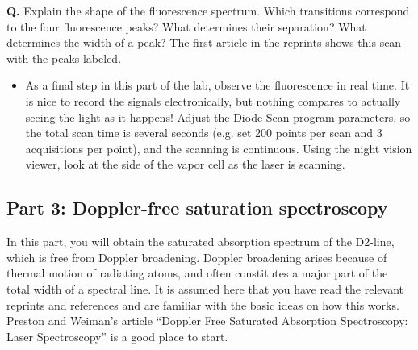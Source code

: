 \documentclass{../lab}
\begin{document}
\textbf{Q.} Explain the shape of the fluorescence spectrum. Which transitions correspond to the four fluorescence peaks? What determines their separation? What determines the width of a peak? The first article in the reprints shows this scan with the peaks labeled.

\begin{itemize}
    \item As a final step in this part of the lab, observe the fluorescence in real time. It is nice to record the signals electronically, but nothing compares to actually seeing the light as it happens! Adjust the Diode Scan program parameters, so the total scan time is several seconds (e.g. set 200 points per scan and 3 acquisitions per point), and the scanning is continuous. Using the night vision viewer, look at the side of the vapor cell as the laser is scanning.

\end{itemize}



\subsection{Part 3: Doppler-free saturation spectroscopy}

In this part, you will obtain the saturated absorption spectrum of the D2-line, which is free from Doppler broadening. Doppler broadening arises because of thermal motion of radiating atoms, and often constitutes a major part of the total width of a spectral line. It is assumed here that you have read the relevant reprints and references and are familiar with the basic ideas on how this works. Preston and Weiman's article ``Doppler Free Saturated Absorption Spectroscopy: Laser Spectroscopy'' is a good place to start.
\end{document}

